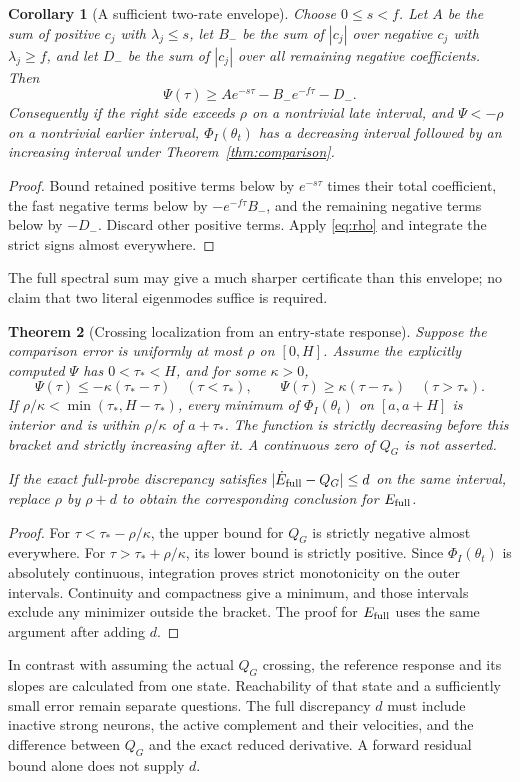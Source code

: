 \documentclass[10pt]{article}
\newtheorem{theorem}{Theorem}[section]
\newtheorem{corollary}[theorem]{Corollary}
\begin{document}
\begin{corollary}[A sufficient two-rate envelope]\label{cor:rates}
Choose $0\le s<f$. Let $A$ be the sum of positive $c_j$ with
$\lambda_j\le s$, let $B_-$ be the sum of $|c_j|$ over negative
$c_j$ with $\lambda_j\ge f$, and let $D_-$ be the sum of $|c_j|$
over all remaining negative coefficients. Then
\[
 \Psi(\tau)\ge A e^{-s\tau}-B_-e^{-f\tau}-D_-.
\]
Consequently if the right side exceeds $\rho$ on a nontrivial late
interval, and $\Psi<-\rho$ on a nontrivial earlier interval,
$\Phi_I(\theta_t)$ has a decreasing interval followed by an increasing
interval under Theorem~\ref{thm:comparison}.
\end{corollary}
\begin{proof}
Bound retained positive terms below by $e^{-s\tau}$ times their total
coefficient, the fast negative terms below by $-e^{-f\tau}B_-$,
and the remaining negative terms below by $-D_-$. Discard other positive
terms. Apply \eqref{eq:rho} and integrate the strict signs almost everywhere.
\end{proof}
The full spectral sum may give a much sharper certificate than this envelope;
no claim that two literal eigenmodes suffice is required.

\begin{theorem}[Crossing localization from an entry-state response]\label{thm:localization}
Suppose the comparison error is uniformly at most $\rho$ on $[0,H]$.
Assume the explicitly computed $\Psi$ has $0<\tau_*<H$, and for some
$\kappa>0$,
\[
 \Psi(\tau)\le-\kappa(\tau_*-\tau)\quad(\tau<\tau_*),\qquad
 \Psi(\tau)\ge\kappa(\tau-\tau_*)\quad(\tau>\tau_*).
\]
If $\rho/\kappa<\min(\tau_*,H-\tau_*)$, every minimum of
$\Phi_I(\theta_t)$ on $[a,a+H]$ is interior and is within
$\rho/\kappa$ of $a+\tau_*$. The function is strictly decreasing before
this bracket and strictly increasing after it. A continuous zero of $Q_G$
is not asserted.

If the exact full-probe discrepancy satisfies
$|\dot E_{\rm full}-Q_G|\le d$ on the same interval, replace $\rho$ by
$\rho+d$ to obtain the corresponding conclusion for $E_{\rm full}$.
\end{theorem}
\begin{proof}
For $\tau<\tau_*-\rho/\kappa$, the upper bound for $Q_G$ is strictly
negative almost everywhere. For $\tau>\tau_*+\rho/\kappa$, its lower
bound is strictly positive. Since $\Phi_I(\theta_t)$ is absolutely
continuous, integration proves strict monotonicity on the outer intervals.
Continuity and compactness give a minimum, and those intervals exclude any
minimizer outside the bracket. The proof for $E_{\rm full}$ uses the same
argument after adding $d$.
\end{proof}
In contrast with assuming the actual $Q_G$ crossing, the reference response
and its slopes are calculated from one state. Reachability of that state and
a sufficiently small error remain separate questions. The full discrepancy
$d$ must include inactive strong neurons, the active complement and their
velocities, and the difference between $Q_G$ and the exact reduced derivative.
A forward residual bound alone does not supply $d$.
\end{document}
